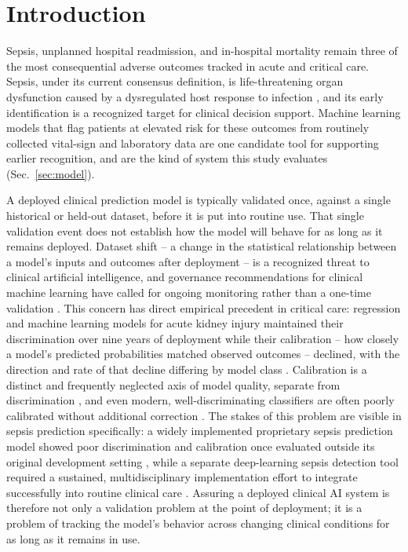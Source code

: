 \documentclass[apajournal,article,submit,oneauthor]{Definitions/mdpi}
\begin{document}
\section{Introduction}\label{sec:introduction}

Sepsis, unplanned hospital readmission, and in-hospital mortality remain three of the most consequential adverse outcomes tracked in acute and critical care. Sepsis, under its current consensus definition, is life-threatening organ dysfunction caused by a dysregulated host response to infection \citep{singer2016}, and its early identification is a recognized target for clinical decision support. Machine learning models that flag patients at elevated risk for these outcomes from routinely collected vital-sign and laboratory data are one candidate tool for supporting earlier recognition, and are the kind of system this study evaluates (Sec.~\ref{sec:model}).

A deployed clinical prediction model is typically validated once, against a single historical or held-out dataset, before it is put into routine use. That single validation event does not establish how the model will behave for as long as it remains deployed. Dataset shift -- a change in the statistical relationship between a model's inputs and outcomes after deployment -- is a recognized threat to clinical artificial intelligence, and governance recommendations for clinical machine learning have called for ongoing monitoring rather than a one-time validation \citep{finlayson2021}. This concern has direct empirical precedent in critical care: regression and machine learning models for acute kidney injury maintained their discrimination over nine years of deployment while their calibration -- how closely a model's predicted probabilities matched observed outcomes -- declined, with the direction and rate of that decline differing by model class \citep{davis2017}. Calibration is a distinct and frequently neglected axis of model quality, separate from discrimination \citep{vancalster2019}, and even modern, well-discriminating classifiers are often poorly calibrated without additional correction \citep{guo2017}. The stakes of this problem are visible in sepsis prediction specifically: a widely implemented proprietary sepsis prediction model showed poor discrimination and calibration once evaluated outside its original development setting \citep{wong2021}, while a separate deep-learning sepsis detection tool required a sustained, multidisciplinary implementation effort to integrate successfully into routine clinical care \citep{sendak2020}. Assuring a deployed clinical AI system is therefore not only a validation problem at the point of deployment; it is a problem of tracking the model's behavior across changing clinical conditions for as long as it remains in use.
\end{document}
